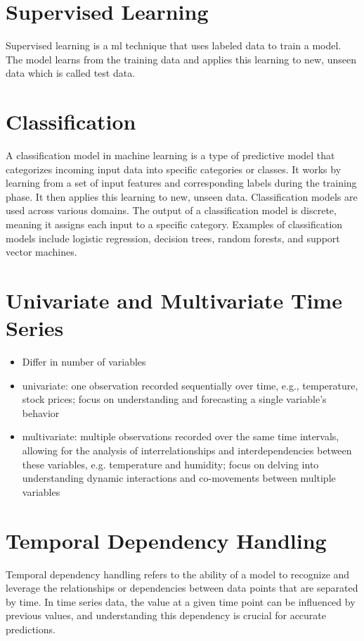 \section{Supervised Learning}
Supervised learning is a \acs{ml} technique that uses labeled data to train a model.
The model learns from the training data and applies this learning to new, unseen data which is called test data.

\section{Classification}

A classification model in machine learning is a type of predictive model that categorizes incoming input data into specific categories or classes.
It works by learning from a set of input features and corresponding labels during the training phase.
It then applies this learning to new, unseen data.
Classification models are used across various domains.
The output of a classification model is discrete, meaning it assigns each input to a specific category.
Examples of classification models include logistic regression, decision trees, random forests, and support vector machines.

\section{Univariate and Multivariate Time Series}
\begin{itemize}
    \item Differ in number of variables
    \item univariate: one observation recorded sequentially over time, e.g., temperature, stock prices; focus on understanding and forecasting a single variable's behavior
    \item multivariate: multiple observations recorded over the same time intervals, allowing for the analysis of interrelationships and interdependencies between these variables, e.g. temperature and humidity; focus on delving into understanding dynamic interactions and co-movements between multiple variables
\end{itemize}

\section{Temporal Dependency Handling}
Temporal dependency handling refers to the ability of a model to recognize and leverage the relationships or dependencies between data points that are separated by time. 
In time series data, the value at a given time point can be influenced by previous values, and understanding this dependency is crucial for accurate predictions.

